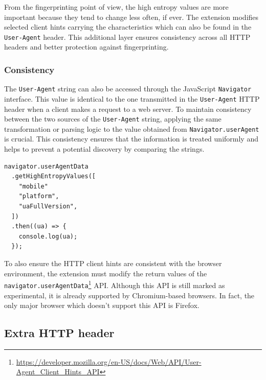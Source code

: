 From the fingerprinting point of view, the high entropy values are more important because they tend to change less often, if ever. The extension modifies selected client hints carrying the characteristics which can also be found in the \texttt{User-Agent} header. This additional layer ensures consistency across all HTTP headers and better protection against fingerprinting.

\subsubsection{Consistency}

The \texttt{User-Agent} string can also be accessed through the JavaScript \texttt{Navigator} interface. This value is identical to the one transmitted in the \texttt{User-Agent} HTTP header when a client makes a request to a web server. To maintain consistency between the two sources of the \texttt{User-Agent} string, applying the same transformation or parsing logic to the value obtained from \texttt{Navigator.userAgent} is crucial. This consistency ensures that the information is treated uniformly and helps to prevent a potential discovery by comparing the strings.

\bigbreak

\begin{lstlisting}[caption={An example the User-Agent Client Hints API usage \cite{MDN}. This API call returns the same values as the HTTP client hints in example \ref{Listing:HTTPClientHintsExample}.}]
navigator.userAgentData
  .getHighEntropyValues([
  	"mobile"
    "platform",
    "uaFullVersion",
  ])
  .then((ua) => {
    console.log(ua);
  });	
\end{lstlisting}

\medbreak

To also ensure the HTTP client hints are consistent with the browser environment, the extension must modify the return values of the \texttt{navigator.userAgentData}\footnote{\url{https://developer.mozilla.org/en-US/docs/Web/API/User-Agent_Client_Hints_API}} API. Although this API is still marked as experimental, it is already supported by Chromium-based browsers. In fact, the only major browser which doesn't support this API is Firefox.

\subsection{Extra HTTP header}
\label{SubSection:ExtraHTTPHeader}

